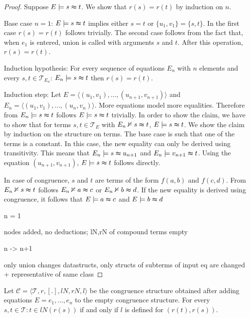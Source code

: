 \begin{proof}

Suppose $E \models s \thickapprox t$.
We show that $r(s) = r(t)$ by induction on $n$.

Base case $n=1$: $E \models s \thickapprox t$ implies either $s = t$ or $\{u_1,v_1\} = \{s,t\}$.
In the first case $r(s) = r(t)$ follows trivially. 
The second case follows from the fact that, when $e_1$ is entered, union is called with arguments $s$ and $t$.
After this operation, $r(s) = r(t)$.

Induction hypothesis: For every sequence of equations $E_n$ with $n$ elements and every $s,t \in \mathcal{T}_{E_n}$: $E_n \models s \thickapprox t$ then $r(s) = r(t)$.

Induction step: Let $E = \langle (u_1,v_1), \ldots, (u_{n+1},v_{n+1}) \rangle$ and $E_n = \langle (u_1,v_1), \ldots, (u_n,v_n) \rangle$.
More equations model more equalities. 
Therefore from $E_n \models s \thickapprox t$ follows $E \models s \thickapprox t$ trivially.
In order to show the claim, we have to show that for terms $s,t \in \mathcal{T}_E$ with $E_n \nvDash s \thickapprox t$, $E \models s \thickapprox t$.
We show the claim by induction on the structure on terms.
The base case is such that one of the terms is a constant.
In this case, the new equality can only be derived using transitivity.
This means that $E_n \models s \thickapprox u_{n+1}$ and $E_n \models v_{n+1} \thickapprox t$.
Using the equation $(u_{n+1},v_{n+1})$, $E \models s \thickapprox t$ follows directly.

In case of congruence, $s$ and $t$ are terms of the form $f(a,b)$ and $f(c,d)$.
From $E_n \nvDash s \thickapprox t$ follows $E_n \nvDash a \thickapprox c$ or $E_n \nvDash b \thickapprox d$.
If the new equality is derived using congruence, it follows that $E \models a \thickapprox c$ and $E \models b \thickapprox d$

n = 1

nodes added, no deductions; lN,rN of compound terms empty 

n -> n+1

only union changes datastructs,
only structs of subterms of input eq are changed + representative of same class

\end{proof}

\begin{proposition}

Let $\mathcal{C} = \langle \mathcal{T},r,[.], lN, rN, l \rangle$ be the congruence structure obtained after adding equations $E = e_1, \ldots, e_n$ to the empty congruence structure.
For every $s,t \in \mathcal{T}: t \in lN(r(s))$ if and only if $l$ is defined for $(r(t),r(s))$.

\end{proposition}

